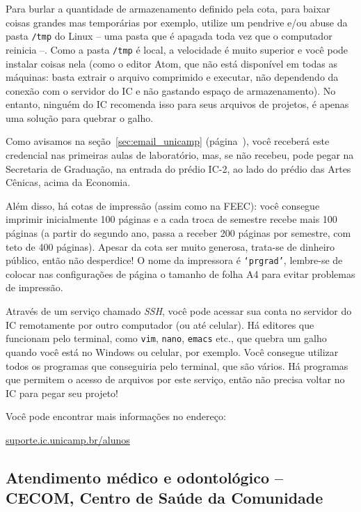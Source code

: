 Para burlar a quantidade de armazenamento definido pela cota, para baixar
coisas grandes mas temporárias por exemplo, utilize um pendrive e/ou abuse da
pasta \texttt{/tmp} do Linux -- uma pasta que é apagada toda vez que o
computador reinicia --. Como a pasta \texttt{/tmp} é local, a velocidade é
muito superior e você pode instalar coisas nela (como o editor Atom, que não
está disponível em todas as máquinas: basta extrair o arquivo comprimido e
executar, não dependendo da conexão com o servidor do IC e não gastando espaço
de armazenamento). No entanto, ninguém do IC recomenda isso para seus arquivos
de projetos, é apenas uma solução para quebrar o galho.

Como avisamos na seção~\ref{sec:email_unicamp}
(página~\pageref{sec:email_unicamp}), você receberá este credencial nas
primeiras aulas de laboratório, mas, se não recebeu, pode pegar na Secretaria
de Graduação, na entrada do prédio IC-2, ao lado do prédio das Artes Cênicas,
acima da Economia.

Além disso, há cotas de impressão (assim como na FEEC): você consegue imprimir
inicialmente 100 páginas e a cada troca de semestre recebe mais 100 páginas (a
partir do segundo ano, passa a receber 200 páginas por semestre, com teto de
400 páginas). Apesar da cota ser muito generosa, trata-se de dinheiro público,
então não desperdice! O nome da impressora é \texttt{`prgrad'}, lembre-se de
colocar nas configurações de página o tamanho de folha A4 para evitar problemas
de impressão.

Através de um serviço chamado \emph{SSH}, você pode acessar sua conta no
servidor do IC remotamente por outro computador (ou até celular). Há editores
que funcionam pelo terminal, como \texttt{vim}, \texttt{nano}, \texttt{emacs}
etc., que quebra um galho quando você está no Windows ou celular, por exemplo.
Você consegue utilizar todos os programas que conseguiria pelo terminal, que
são vários. Há programas que permitem o acesso de arquivos por este serviço,
então não precisa voltar no IC para pegar seu projeto!

Você pode encontrar mais informações no endereço:

\begin{center}
\url{suporte.ic.unicamp.br/alunos} %
\end{center}

\subsection{Atendimento médico e odontológico -- CECOM, Centro de Saúde da
Comunidade}

